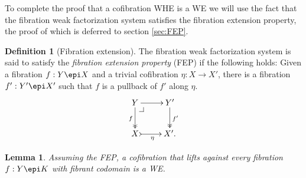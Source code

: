 \documentclass[12pt]{article}
\makeatletter
\newcommand{\pbcorner}[1][dr]{\save*!/#1-1.2pc/#1:(-1,1)@^{|-}\restore}
\newcommand{\ra}{\ensuremath{\rightarrow}}
\newtheorem{proposition}[theorem]{Proposition}
\newtheorem{lemma}[theorem]{Lemma}
\theoremstyle{remark}
\theoremstyle{definition}
\newtheorem{definition}[theorem]{Definition}
\makeatother
\begin{document}

To complete the proof that a cofibration WHE is a WE we will use the fact that the fibration weak factorization system satisfies the fibration extension property, the proof of which is deferred to section \ref{sec:FEP}.

\begin{definition}[Fibration extension]\label{def:fibextreplace}
The fibration weak factorization system is said to satisfy the \emph{fibration extension property} (FEP) if the following holds: Given a fibration $ f : Y \epi X$ and a trivial cofibration $\eta: X\ra X'$,
there is a fibration $f' : Y' \epi X'$ such that $f$ is a pullback of $f'$ along $\eta$. 
\begin{equation}\label{diagram:FEP}
\xymatrix{
Y \ar@{->>}[d]_{f} \ar[r]  \pbcorner & Y' \ar@{>>}[d]^{f'} \\
X \ar@{>->}[r]_{\eta} &  X'.
}
\end{equation}
\end{definition}

\begin{lemma}\label{lemma:CofWEiffFibLift}
Assuming the FEP, a cofibration that lifts against every fibration $f : Y\epi K$ with fibrant codomain is a WE.
\end{lemma}
\end{document}
